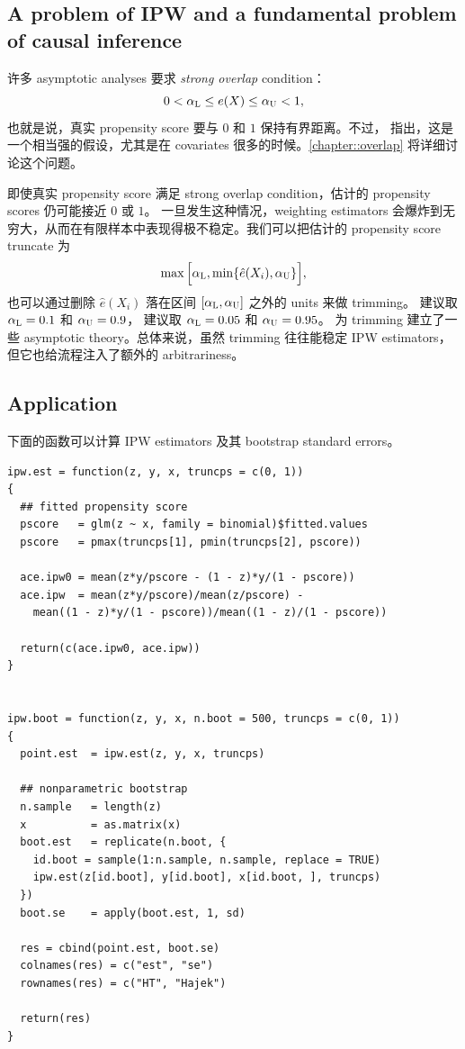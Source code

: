 \subsection{A problem of IPW and a fundamental problem of causal inference}
\label{sec::ipw-problem}


许多 asymptotic analyses 要求 {\it strong overlap} condition：
$$
0<  \alpha_\textsc{L} \leq e(X) \leq  \alpha_\textsc{U} < 1,
$$
也就是说，真实 propensity score 要与 $0$ 和 $1$ 保持有界距离。不过，\citet{d2017overlap} 指出，这是一个相当强的假设，尤其是在 covariates 很多的时候。\cref{chapter::overlap} 将详细讨论这个问题。


即使真实 propensity score 满足 strong overlap condition，估计的 propensity scores 仍可能接近 $0$ 或 $1$。
一旦发生这种情况，weighting estimators 会爆炸到无穷大，从而在有限样本中表现得极不稳定。我们可以把估计的 propensity score truncate 为
$$
 \max\Big[  \alpha_\textsc{L},   \min\{   \hat{e}(X_i), \alpha_\textsc{U} \}   \Big] ,
$$
也可以通过删除 $\hat{e}(X_i)$ 落在区间 $[\alpha_\textsc{L},   \alpha_\textsc{U}  ]$ 之外的 units 来做 trimming。\citet{crump2009dealing} 建议取 $  \alpha_\textsc{L} = 0.1$ 和 $\alpha_\textsc{U} = 0.9 $，\citet{kurth2005results} 建议取 $  \alpha_\textsc{L} = 0.05$ 和 $\alpha_\textsc{U} = 0.95 $。\citet{yang2018asymptotic} 为 trimming 建立了一些 asymptotic theory。总体来说，虽然 trimming 往往能稳定 IPW estimators，但它也给流程注入了额外的 arbitrariness。




 \subsection{Application}\label{sec::application-pscore-weighting}


下面的函数可以计算 IPW estimators 及其 bootstrap standard errors。
\begin{lstlisting}
ipw.est = function(z, y, x, truncps = c(0, 1))
{
  ## fitted propensity score
  pscore   = glm(z ~ x, family = binomial)$fitted.values
  pscore   = pmax(truncps[1], pmin(truncps[2], pscore))
  
  ace.ipw0 = mean(z*y/pscore - (1 - z)*y/(1 - pscore))
  ace.ipw  = mean(z*y/pscore)/mean(z/pscore) - 
    mean((1 - z)*y/(1 - pscore))/mean((1 - z)/(1 - pscore))
  
  return(c(ace.ipw0, ace.ipw))     
}


ipw.boot = function(z, y, x, n.boot = 500, truncps = c(0, 1))
{
  point.est  = ipw.est(z, y, x, truncps)
  
  ## nonparametric bootstrap
  n.sample   = length(z)
  x          = as.matrix(x)
  boot.est   = replicate(n.boot, {
    id.boot = sample(1:n.sample, n.sample, replace = TRUE)
    ipw.est(z[id.boot], y[id.boot], x[id.boot, ], truncps)
  })
  boot.se    = apply(boot.est, 1, sd)
  
  res = cbind(point.est, boot.se)
  colnames(res) = c("est", "se")
  rownames(res) = c("HT", "Hajek")
  
  return(res)
}
\end{lstlisting}

